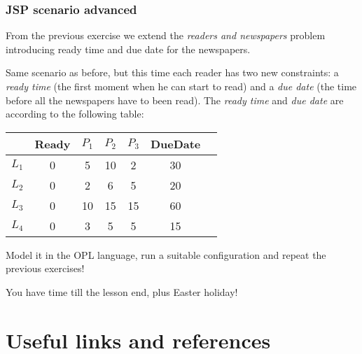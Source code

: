 \begin{frame} \frametitle{JSP scenario advanced}
\pause
From the previous exercise we extend the \emph{readers and newspapers} problem introducing ready time and due date for the newspapers.

\pause \medskip

Same scenario as before, but this time each reader has two new constraints: a \emph{ready time} (the first moment when he can start to read) and a \emph{due date} (the time before all the newspapers have to been read). The \emph{ready time} and \emph{due date} are according to the following table:

\pause \medskip

\begin{table}
\centering
\begin{tabular}{|l|c|c|c|c|c|c|}
\hline
		& Ready	& $P_1$	& $P_2$	& $P_3$	& DueDate	\\ \hline
$L_1$	& 0		& 5		& 10	& 2		& 30		\\ \hline
$L_2$	& 0		& 2		& 6		& 5		& 20		\\ \hline
$L_3$	& 0		& 10	& 15	& 15	& 60		\\ \hline
$L_4$	& 0		& 3		& 5		& 5		& 15		\\ \hline
\end{tabular}
	
\end{table}

\pause

\begin{center}
	Model it in the OPL language, run a suitable configuration and repeat the previous exercises!
\end{center}

\begin{center}
	You have time till the lesson end, plus Easter holiday! 
\end{center}


\end{frame}


\section{Useful links and references}

